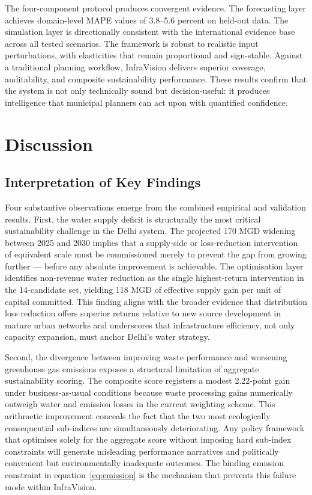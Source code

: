 \documentclass[conference]{IEEEtran}
\begin{document}
The four-component protocol produces convergent evidence. The
forecasting layer achieves domain-level MAPE values of 3.8--5.6 percent
on held-out data. The simulation layer is directionally consistent with
the international evidence base across all tested scenarios. The
framework is robust to realistic input perturbations, with elasticities
that remain proportional and sign-stable. Against a traditional
planning workflow, InfraVision delivers superior coverage, auditability,
and composite sustainability performance. These results confirm that the
system is not only technically sound but decision-useful: it produces
intelligence that municipal planners can act upon with quantified
confidence.

\section{Discussion}
\label{sec:discussion}

\subsection{Interpretation of Key Findings}

Four substantive observations emerge from the combined empirical and
validation results. First, the water supply deficit is structurally the
most critical sustainability challenge in the Delhi system. The projected
170 MGD widening between 2025 and 2030 implies that a supply-side or
loss-reduction intervention of equivalent scale must be commissioned
merely to prevent the gap from growing further --- before any absolute
improvement is achievable. The optimisation layer identifies non-revenue
water reduction as the single highest-return intervention in the
14-candidate set, yielding 118 MGD of effective supply gain per unit of
capital committed. This finding aligns with the broader evidence that
distribution loss reduction offers superior returns relative to new
source development in mature urban networks \cite{alkhateeb2024} and
underscores that infrastructure efficiency, not only capacity expansion,
must anchor Delhi's water strategy.

Second, the divergence between improving waste performance and worsening
greenhouse gas emissions exposes a structural limitation of aggregate
sustainability scoring. The composite score registers a modest 2.22-point
gain under business-as-usual conditions because waste processing gains
numerically outweigh water and emission losses in the current weighting
scheme. This arithmetic improvement conceals the fact that the two most
ecologically consequential sub-indices are simultaneously deteriorating.
Any policy framework that optimises solely for the aggregate score
without imposing hard sub-index constraints will generate misleading
performance narratives and politically convenient but environmentally
inadequate outcomes. The binding emission constraint in
equation~\eqref{eq:emission} is the mechanism that prevents this failure
mode within InfraVision.
\end{document}
